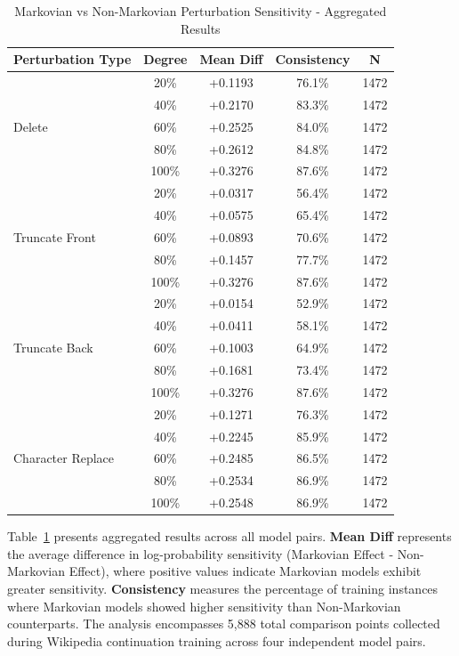\documentclass[letterpaper]{article} %
\begin{document}
\begin{table}[h]
\centering
\caption{Markovian vs Non-Markovian Perturbation Sensitivity - Aggregated Results}
\label{tab:markovian_comparison}
\small
\begin{tabular}{lcccc}
\hline
\textbf{Perturbation Type} & \textbf{Degree} & \textbf{Mean Diff} & \textbf{Consistency} & \textbf{N} \\
\hline
\multirow{5}{*}{Delete} 
& 20\% & +0.1193 & 76.1\% & 1472 \\
& 40\% & +0.2170 & 83.3\% & 1472 \\
& 60\% & +0.2525 & 84.0\% & 1472 \\
& 80\% & +0.2612 & 84.8\% & 1472 \\
& 100\% & +0.3276 & 87.6\% & 1472 \\
\hline
\multirow{5}{*}{Truncate Front} 
& 20\% & +0.0317 & 56.4\% & 1472 \\
& 40\% & +0.0575 & 65.4\% & 1472 \\
& 60\% & +0.0893 & 70.6\% & 1472 \\
& 80\% & +0.1457 & 77.7\% & 1472 \\
& 100\% & +0.3276 & 87.6\% & 1472 \\
\hline
\multirow{5}{*}{Truncate Back} 
& 20\% & +0.0154 & 52.9\% & 1472 \\
& 40\% & +0.0411 & 58.1\% & 1472 \\
& 60\% & +0.1003 & 64.9\% & 1472 \\
& 80\% & +0.1681 & 73.4\% & 1472 \\
& 100\% & +0.3276 & 87.6\% & 1472 \\
\hline
\multirow{5}{*}{Character Replace} 
& 20\% & +0.1271 & 76.3\% & 1472 \\
& 40\% & +0.2245 & 85.9\% & 1472 \\
& 60\% & +0.2485 & 86.5\% & 1472 \\
& 80\% & +0.2534 & 86.9\% & 1472 \\
& 100\% & +0.2548 & 86.9\% & 1472 \\
\hline
\end{tabular}
\end{table}

Table~\ref{tab:markovian_comparison} presents aggregated results across all model pairs. \textbf{Mean Diff} represents the average difference in log-probability sensitivity (Markovian Effect - Non-Markovian Effect), where positive values indicate Markovian models exhibit greater sensitivity. \textbf{Consistency} measures the percentage of training instances where Markovian models showed higher sensitivity than Non-Markovian counterparts. The analysis encompasses 5,888 total comparison points collected during Wikipedia continuation training across four independent model pairs.
\end{document}
